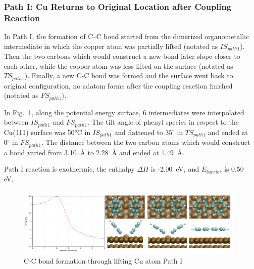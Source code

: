 \documentclass[%
 reprint,
 amsmath,amssymb,
 aps,
prb,
]{revtex4-2}
\begin{document}
\subsubsection{Path I: Cu Returns to Original Location after Coupling Reaction}

In Path I, the formation of C--C bond started from the dimerized organometallic intermediate in which the copper atom was partially lifted (notated as $IS_{path1}$). Then the two carbons which would construct a new bond later slope closer to each other, while the copper atom was less lifted on the surface (notated as $TS_{path1}$). Finally, a new C-C bond was formed and the surface went back to original configuration, no adatom forms after the coupling reaction finished (notated as $FS_{path1}$).


In Fig.~\ref{fig:bondformlift}, along the potential energy surface, 6 intermediates were interpolated between $IS_{path1}$ and $FS_{path1}$. The tilt angle of phenyl species in respect to the Cu(111) surface was 50\si{\celsius} in $IS_{path1}$ and flattened to $35^\circ$ in $TS_{path1}$ and ended at $0^\circ$ in $FS_{path1}$. The distance between the two carbon atoms which would construct a bond varied from 3.10~\si{\angstrom} to 2.28~\si{\angstrom} and ended at 1.49~\si{\angstrom}.

Path I reaction is exothermic, the enthalpy $\Delta H$ is -2.00~\si{\eV}, and $E_{barrier}$ is 0.50 eV.

\begin{figure}[hbt]
\centering
\includegraphics[width=1.0\textwidth]{Fig/bondformlift.png}
\caption{C-C bond formation through lifting Cu atom Path I}
\label{fig:bondformlift}
\end{figure}
\end{document}
